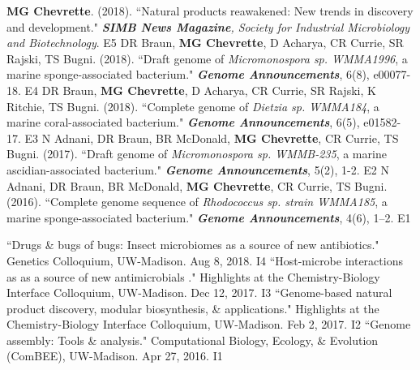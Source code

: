 \begin{cvpubs}
  \cvpub
    {\textbf{MG Chevrette}. (2018). ``Natural products reawakened: New trends in discovery and development." \textit{\textbf{SIMB News Magazine}, Society for Industrial Microbiology and Biotechnology}. }  %
    {E5} %
  \cvpub
    {DR Braun, \textbf{MG Chevrette}, D Acharya, CR Currie, SR Rajski, TS Bugni. (2018). ``Draft genome of \textit{Micromonospora sp. WMMA1996}, a marine sponge-associated bacterium." \textit{\textbf{Genome Announcements}}, 6(8), e00077-18. \textbf{\textit{}} }  %
    {E4} %
  \cvpub
    {DR Braun, \textbf{MG Chevrette}, D Acharya, CR Currie, SR Rajski, K Ritchie, TS Bugni. (2018). ``Complete genome of \textit{Dietzia sp. WMMA184}, a marine coral-associated bacterium." \textit{\textbf{Genome Announcements}}, 6(5), e01582-17. \textbf{\textit{}} } %
    {E3} %
  \cvpub
    {N Adnani, DR Braun, BR McDonald, \textbf{MG Chevrette}, CR Currie, TS Bugni. (2017). ``Draft genome of \textit{Micromonospora sp. WMMB-235}, a marine ascidian-associated bacterium." \textit{\textbf{Genome Announcements}}, 5(2), 1-2. \textbf{\textit{}} } %
    {E2} %
  \cvpub
  {N Adnani, DR Braun, BR McDonald, \textbf{MG Chevrette}, CR Currie, TS Bugni. (2016). ``Complete genome sequence of \textit{Rhodococcus sp. strain WMMA185}, a marine sponge-associated bacterium." \textit{\textbf{Genome Announcements}}, 4(6), 1–2. \textbf{\textit{}}} %
    {E1} %
\end{cvpubs}


\begin{cvpubs} 
  \cvpub
    {``Drugs \& bugs of bugs: Insect microbiomes as a source of new antibiotics." Genetics Colloquium, UW-Madison. Aug 8, 2018.} %
    {I4} %
  \cvpub
    {``Host-microbe interactions as as a source of new antimicrobials
." Highlights at the Chemistry-Biology Interface Colloquium, UW-Madison. Dec 12, 2017.} %
    {I3} %
  \cvpub
    {``Genome-based natural product discovery, modular biosynthesis, \& applications." Highlights at the Chemistry-Biology Interface Colloquium, UW-Madison. Feb 2, 2017.} %
    {I2} %
  \cvpub
    {``Genome assembly: Tools \& analysis." Computational Biology, Ecology, \& Evolution (ComBEE), UW-Madison. Apr 27, 2016.} %
    {I1} %
\end{cvpubs}


